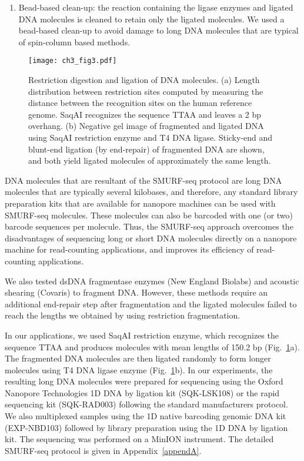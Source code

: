 \begin{enumerate}
\item Bead-based clean-up: the reaction containing the ligase enzymes and
  ligated DNA molecules is cleaned to retain only the ligated molecules. We
  used a bead-based clean-up to avoid damage to long DNA
  molecules that are typical of spin-column based methods.
\end{enumerate}

\begin{figure}[b!]
\centering
\texttt{[image: ch3\_fig3.pdf]}
\caption[Restriction digestion and ligation of DNA molecules.]{
  Restriction digestion and ligation of DNA molecules.
  (a) Length distribution between restriction sites computed
  by measuring the distance between the recognition sites on the human
  reference genome. SaqAI recognizes the sequence TTAA and leaves a 2 bp
  overhang.
  (b) Negative gel image of fragmented and ligated DNA
  using SaqAI restriction enzyme and T4 DNA ligase.  Sticky-end and
  blunt-end ligation (by end-repair) of fragmented DNA are shown, and
  both yield ligated molecules of approximately the same length.}
\label{re_frag}
\end{figure}

DNA molecules that are resultant of the SMURF-seq protocol are long DNA
molecules that are typically several kilobases, and therefore, any
standard library preparation kits that are available for nanopore
machines can be used with SMURF-seq molecules. These molecules can also
be barcoded with one (or two) barcode sequences per molecule. Thus, the
SMURF-seq approach overcomes the disadvantages of sequencing long or
short DNA molecules directly on a nanopore machine for read-counting
applications, and improves its efficiency of read-counting applications.

We also tested dsDNA fragmentase enzymes (New England Biolabs) and
acoustic shearing (Covaris) to fragment DNA. However, these methods
require an additional end-repair step after fragmentation and the
ligated molecules failed to reach the lengths we obtained by using
restriction fragmentation.

In our applications, we used SaqAI restriction enzyme, which recognizes
the sequence TTAA and produces molecules with mean lengths of 150.2 bp
(Fig.~\ref{re_frag}a).
The fragmented DNA molecules are then ligated randomly to form longer
molecules using T4 DNA ligase enzyme (Fig.~\ref{re_frag}b).
%
In our experiments, the resulting long DNA molecules were prepared for
sequencing using the Oxford Nanopore Technologies 1D DNA by ligation kit
(SQK-LSK108) or the rapid sequencing kit (SQK-RAD003) following the
standard manufacturers protocol. We also multiplexed samples using the
1D native barcoding genomic DNA kit (EXP-NBD103) followed by library
preparation using the 1D DNA by ligation kit. The sequencing was
performed on a MinION instrument.
%
The detailed SMURF-seq protocol is given in Appendix~\ref{appendA}.



